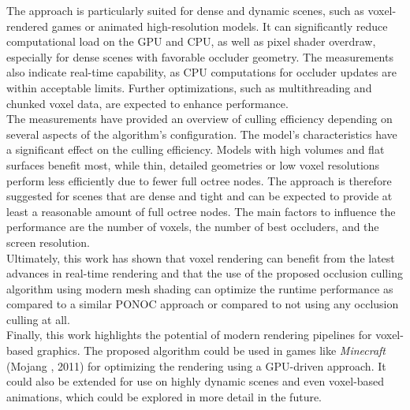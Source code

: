 \clearpage

\noindent
The approach is particularly suited for dense and dynamic scenes, such as voxel-rendered 
games or animated high-resolution models. It can significantly reduce computational load 
on the \ac{GPU} and \ac{CPU}, as well as pixel shader overdraw, especially for dense scenes with 
favorable occluder geometry. The measurements also indicate real-time capability, as 
\ac{CPU} computations for occluder updates are within acceptable limits. Further 
optimizations, such as multithreading and chunked voxel data, are expected to enhance 
performance. \\


\noindent
The measurements have provided an overview of culling efficiency depending on several 
aspects of the algorithm's configuration. The model's characteristics have a significant 
effect on the culling efficiency. Models with high volumes and flat surfaces benefit most, 
while thin, detailed geometries or low voxel resolutions perform less efficiently due 
to fewer full octree nodes. The approach is therefore suggested for scenes that are dense 
and tight and can be expected to provide at least a reasonable amount of full octree nodes. 
The main factors to influence the performance are the number of voxels, the number of 
best occluders, and the screen resolution.\\

\noindent
Ultimately, this work has shown that voxel rendering can benefit from the latest advances 
in real-time rendering and that the use of the proposed occlusion culling algorithm 
using modern mesh shading can optimize the runtime performance as compared to a similar 
\ac{PONOC} approach or compared to not using any occlusion culling at all. \\

\noindent
Finally, this work highlights the potential of modern rendering pipelines for voxel-based 
graphics. The proposed algorithm could be used in games like \emph{Minecraft} (Mojang 
\cite{Mojang2024}, 2011) for optimizing the rendering using a \ac{GPU}-driven approach. It 
could also be extended for use on highly dynamic scenes and even voxel-based animations, 
which could be explored in more detail in the future.
